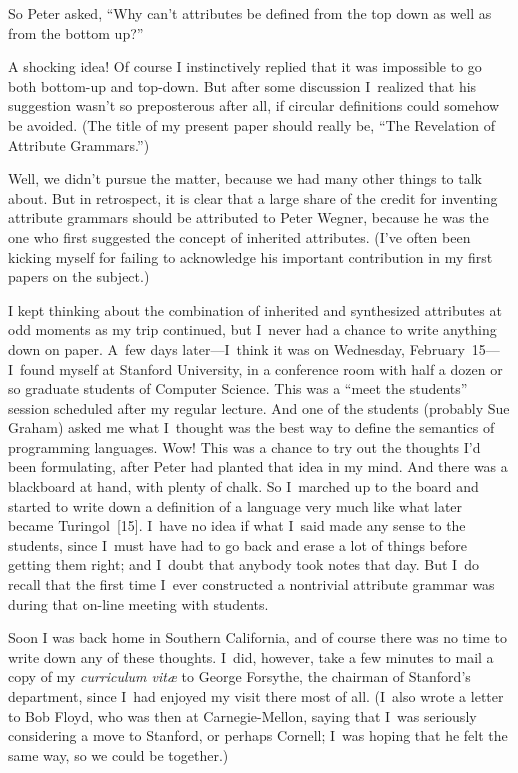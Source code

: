 So Peter asked, ``Why can't attributes be defined from the top down as
well as from the bottom up?''

A shocking idea! Of course I instinctively replied that it was
impossible to go both bottom-up and top-down. But after some
discussion I~realized that his suggestion wasn't so preposterous after
all, if circular definitions could somehow be avoided. 
(The title of my present paper should really be, ``The Revelation of
Attribute Grammars.'')

Well, we didn't pursue the matter, because we had many other things to
talk about. But in retrospect, it is clear that a large share of the
credit for inventing attribute grammars should be attributed to Peter
Wegner, because he was the one who first suggested the concept of
inherited attributes. (I've often been kicking myself for
failing to acknowledge his important contribution in my first papers
on the subject.)

I kept thinking about the combination of inherited and synthesized
attributes at odd moments as my trip continued, but I~never had a
chance to write anything down on paper. A~few days later---I~think it
was on Wednesday, February~15---I~found myself at Stanford University,
in a conference room with half a dozen or so graduate students of
Computer Science. This was a ``meet the students'' session scheduled
after my regular lecture. And one of the students (probably Sue
Graham) asked me what I~thought was the best way to define the
semantics of programming languages. Wow! This was a chance to try out
the thoughts I'd been formulating, after Peter had planted that idea
 in my mind. And there was a blackboard at hand, with plenty of
chalk. So I~marched up to the board and started to write down a
definition of a language very much like what later became 
Turingol~[15].
I~have no idea if what I~said made any sense to the students, since
I~must have had to go back and erase a lot of things before getting
them right; and I~doubt that anybody took notes that day. But I~do
recall that the first time I~ever constructed a nontrivial attribute
grammar was during that on-line meeting with students.

Soon I was back home in Southern California, and of course there was
no time to write down any of these thoughts. I~did, however, take a
few minutes to mail a copy of my {\it curriculum vit{\ae}\/} to George
Forsythe, the chairman of Stanford's department, since I~had enjoyed
my visit there most of all. (I~also wrote a letter to Bob Floyd, who
was then at Carnegie-Mellon, saying that I~was seriously considering a
move to Stanford, or perhaps Cornell; I~was hoping that he felt the
same way, so we could be together.)

